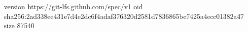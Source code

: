 version https://git-lfs.github.com/spec/v1
oid sha256:2ad338ee431e7d4e2dc6f4adaf376320d2581d7836865bc7425a4ecc01382a47
size 87540
